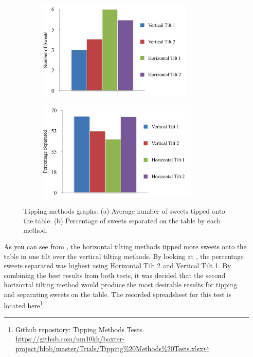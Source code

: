 \begin{figure}[H]
    \captionsetup[subfigure]{justification=centering}
    \begin{subfigure}[H]{0.475\textwidth}   
        \centering 
        \caption{}
        \label{fig:avsweetstipped}
        \includegraphics[width=\textwidth, height=5cm]{averagesweetstipped.png}
    \end{subfigure}
    \begin{subfigure}[H]{0.475\textwidth}   
        \centering 
        \caption{}
        \label{fig:percentageseparated}
        \includegraphics[width=\textwidth, height=5cm]{separatedsweets.png}
    \end{subfigure}
    \vspace{-0.2cm}
    \caption{Tipping methods graphs: (a) Average number of sweets tipped onto the table. (b) Percentage of sweets separated on the table by each method.}
\end{figure}
As you can see from \textbf{}, the horizontal tilting methods tipped more sweets onto the table in one tilt over the vertical tilting methods. By looking at \textbf{}, the percentage sweets separated was highest using Horizontal Tilt 2 and Vertical Tilt 1. By combining the best results from both tests, it was decided that the second horizontal tilting method would produce the most desirable results for tipping and separating sweets on the table. The recorded spreadsheet for this test is located here\footnote{Github repository: Tipping Methods Tests. \url{https://github.com/um10kh/baxter-project/blob/master/Trials/Tipping\%20Methods\%20Tests.xlsx}}.
